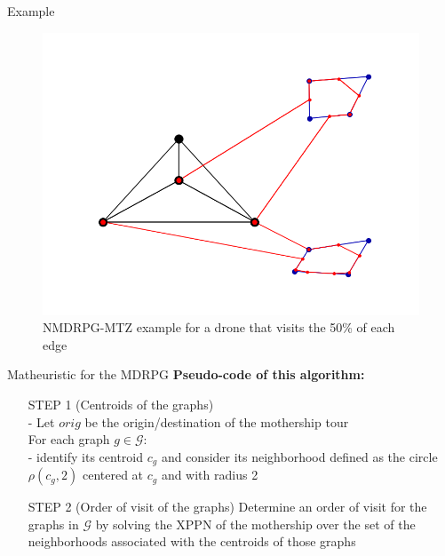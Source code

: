 \documentclass[slidestop,usepdftitle=false,10pt]{beamer}
\begin{document}
	\begin{frame}{Example}
    	\begin{figure}
    	\centering
		\includegraphics[width=0.6\linewidth]{NDMTZ}
		\caption{NMDRPG-MTZ example for a drone that visits the 50\% of each edge}
		\end{figure}
	\end{frame}
	
	\begin{frame}{Matheuristic for the MDRPG}
	   \textbf{Pseudo-code of this algorithm:}
	   \begin{itemize} 
            \item[STEP 1] (Centroids of the graphs)\\
            - Let $orig$ be the origin/destination of the mothership tour \\ %
            For each graph $g \in \mathcal G$:\\
            - identify its centroid $c_g$ and consider its neighborhood defined as the circle $\rho(c_g,2)$ centered at $c_g$ and with radius 2 %
            \item[STEP 2] (Order of visit of the graphs)
            Determine an order of visit for the graphs in $\mathcal{G}$ by solving the XPPN of the mothership over the set of the neighborhoods associated with the centroids of those graphs %
        \end{itemize}
    \end{frame}
    
\end{document}
